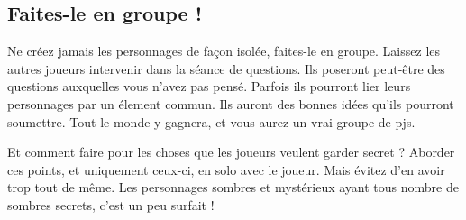 \begin{multicols}{2}
\subsection{Faites-le en groupe !}

Ne créez jamais les personnages de façon isolée, faites-le en groupe. Laissez les autres joueurs intervenir dans la séance de questions. Ils poseront peut-être des questions auxquelles vous n'avez pas pensé. Parfois ils pourront lier leurs personnages par un élement commun. Ils auront des bonnes idées qu'ils pourront soumettre. Tout le monde y gagnera, et vous aurez un vrai groupe de pjs.

Et comment faire pour les choses que les joueurs veulent garder secret ? Aborder ces points, et uniquement ceux-ci, en solo avec le joueur. Mais évitez d'en avoir trop tout de même. Les personnages sombres et mystérieux ayant tous nombre de sombres secrets, c'est un peu surfait !

\end{multicols}

